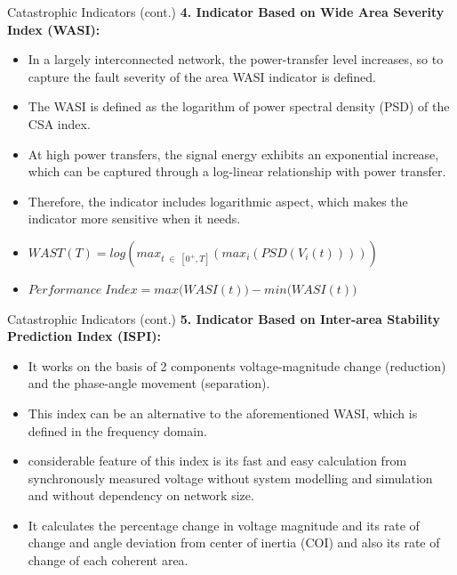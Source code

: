 \documentclass [xcolor=svgnames, t] {beamer}
\begin{document}
\begin{frame}{Catastrophic Indicators (cont.)}
\textbf{4. Indicator Based on Wide Area Severity Index (WASI):}
\begin{itemize}
\item In a largely interconnected network, the power-transfer level increases, so to capture the fault severity of the area WASI indicator is defined.
\item The WASI is defined as the logarithm of power spectral density (PSD) of the CSA index.
\item At high power transfers, the signal energy exhibits an exponential increase, which can be captured through a log-linear relationship with power transfer.
\item Therefore, the indicator includes logarithmic aspect, which makes the indicator more sensitive when it needs.
\item $WAST(T) = log(max_{t \; \in \; [0^+,T]}(max_i(PSD(V_i(t)))))$
\item $Performance \; Index = max\big(WASI(t)\big) - min\big(WASI(t)\big)$
\end{itemize}
\end{frame}

\begin{frame}{Catastrophic Indicators (cont.)}
\textbf{5. Indicator Based on Inter-area Stability Prediction Index (ISPI):}
\begin{itemize}
\item It works on the basis of 2 components voltage-magnitude change (reduction) and the phase-angle movement (separation). 
\item This index can be an alternative to the aforementioned WASI, which is defined in the frequency domain.
\item considerable feature of this index is its fast and easy calculation from synchronously measured voltage without system modelling and simulation and without dependency on network size.
\item It calculates the percentage change in voltage magnitude and its rate of change and angle deviation from center of inertia (COI) and also its rate of change of each coherent area.
\end{itemize}
\end{frame}
\end{document}
